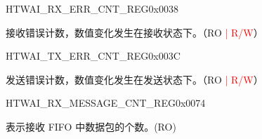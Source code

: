 \begin{register}{H}{TWAI\_RX\_ERR\_CNT\_REG}{0x0038}\label{regdesc:TWAIRXERRCNTREG}
%
%
\regnewline%
\begin{regdesc}\begin{reglist}
\label{fielddesc:TWAIRXERRCNT}\item [TWAI\_RX\_ERR\_CNT] 接收错误计数，数值变化发生在接收状态下。（RO \textcolor{red}{| R/W}）
\end{reglist}\end{regdesc}
\end{register}


\begin{register}{H}{TWAI\_TX\_ERR\_CNT\_REG}{0x003C}\label{regdesc:TWAITXERRCNTREG}
%
%
\regnewline%
\begin{regdesc}\begin{reglist}
\label{fielddesc:TWAITXERRCNT}\item [TWAI\_TX\_ERR\_CNT] 发送错误计数，数值变化发生在发送状态下。（RO \textcolor{red}{| R/W}）
\end{reglist}\end{regdesc}
\end{register}


\begin{register}{H}{TWAI\_RX\_MESSAGE\_CNT\_REG}{0x0074}\label{regdesc:TWAIRXMESSAGECNTREG}
%
%
\regnewline%
\begin{regdesc}\begin{reglist}
\label{fielddesc:TWAIRXMESSAGECOUNTER}\item [TWAI\_RX\_MESSAGE\_COUNTER] 表示接收 FIFO 中数据包的个数。(RO)
\end{reglist}\end{regdesc}
\end{register}


